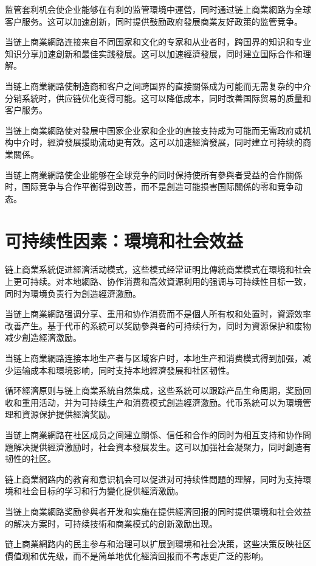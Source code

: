 \documentclass[
  Letterpaper,
]{scrbook}
\begin{document}
监管套利机会使企业能够在有利的监管環境中運營，同时通过链上商業網路为全球客户服务。这可以加速創新，同时提供鼓励政府發展商業友好政策的监管竞争。

当链上商業網路连接来自不同国家和文化的专家和从业者时，跨国界的知识和专业知识分享加速創新和最佳实践發展。这可以加速經濟發展，同时建立国际合作和理解。

当链上商業網路使制造商和客户之间跨国界的直接關係成为可能而无需复杂的中介分销系統时，供应链优化变得可能。这可以降低成本，同时改善国际贸易的质量和客户服务。

当链上商業網路使对發展中国家企业家和企业的直接支持成为可能而无需政府或机构中介时，經濟發展援助流动更有效。这可以加速經濟發展，同时建立可持续的商業關係。

当链上商業網路使企业能够在全球竞争的同时保持使所有參與者受益的合作關係时，国际竞争与合作平衡得到改善，而不是創造可能损害国际關係的零和竞争动态。

\section{可持续性因素：環境和社会效益}\label{ux53efux6301ux7eedux6027ux56e0ux7d20ux74b0ux5883ux548cux793eux4f1aux6548ux76ca}

链上商業系統促进經濟活动模式，这些模式经常证明比傳統商業模式在環境和社会上更可持续。对本地網路、协作消费和高效資源利用的强调与可持续性目标一致，同时为環境负责行为創造經濟激励。

当链上商業網路强调分享、重用和协作消费而不是個人所有权和处置时，資源效率改善产生。基于代币的系統可以奖励參與者的可持续行为，同时为資源保护和废物减少創造經濟激励。

当链上商業網路连接本地生产者与区域客户时，本地生产和消费模式得到加强，减少运输成本和環境影响，同时支持本地經濟發展和社区韧性。

循环經濟原则与链上商業系統自然集成，这些系統可以跟踪产品生命周期，奖励回收和重用活动，并为可持续生产和消费模式創造經濟激励。代币系統可以为環境管理和資源保护提供經濟奖励。

当链上商業網路在社区成员之间建立關係、信任和合作的同时为相互支持和协作問題解决提供經濟激励时，社会資本發展发生。这可以加强社会凝聚力，同时創造有韧性的社区。

链上商業網路内的教育和意识机会可以促进对可持续性問題的理解，同时为支持環境和社会目标的学习和行为變化提供經濟激励。

当链上商業網路奖励參與者开发和实施在提供經濟回报的同时提供環境和社会效益的解决方案时，可持续技術和商業模式的創新激励出现。

链上商業網路内的民主参与和治理可以扩展到環境和社会决策，这些决策反映社区價值观和优先级，而不是简单地优化經濟回报而不考虑更广泛的影响。
\end{document}
